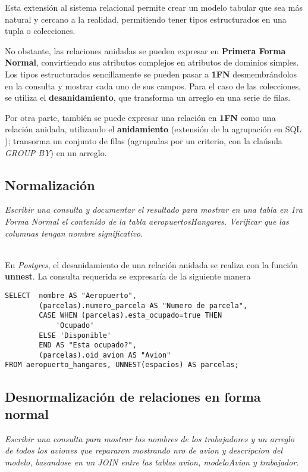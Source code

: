 Esta extensión al sistema relacional permite crear un modelo tabular que sea más natural y cercano a la realidad, permitiendo tener tipos estructurados en una tupla o colecciones.

No obstante, las relaciones anidadas se pueden expresar en \textbf{Primera Forma Normal}, convirtiendo sus atributos complejos en atributos de dominios simples. Los tipos estructurados sencillamente se pueden pasar a \textbf{1FN} desmembrándolos en la consulta y mostrar cada uno de sus campos. Para el caso de las colecciones, se utiliza el \textbf{desanidamiento}, que transforma un arreglo en una serie de filas.

Por otra parte, también se puede expresar una relación en \textbf{1FN} como una relación anidada, utilizando el \textbf{anidamiento} (extensión de la agrupación en SQL \autocite{silberschatz}); transorma un conjunto de filas (agrupadas por un criterio, con la claúsula \emph{GROUP BY}) en un arreglo.

\subsection{Normalización}
\emph{Escribir una consulta y documentar el resultado para mostrar en una tabla en 1ra Forma Normal el contenido de la tabla aeropuertosHangares. Verificar que las columnas tengan nombre significativo.} 

~\\

En \emph{Postgres}, el desanidamiento de una relación anidada se realiza con la función \textbf{unnest}. La consulta requerida se expresaría de la siguiente manera  

\vspace*{5mm}
\lstset{style=sql}
\begin{lstlisting}
SELECT  nombre AS "Aeropuerto", 
        (parcelas).numero_parcela AS "Numero de parcela", 
        CASE WHEN (parcelas).esta_ocupado=true THEN 
            'Ocupado' 
        ELSE 'Disponible' 
        END AS "Esta ocupado?", 
        (parcelas).oid_avion AS "Avion" 
FROM aeropuerto_hangares, UNNEST(espacios) AS parcelas;
\end{lstlisting}

\subsection{Desnormalización de relaciones en forma normal}
\emph{Escribir una consulta para mostrar los nombres de los trabajadores y un arreglo de todos los aviones que repararon mostrando nro de avion y descripcion del modelo, basandose en un JOIN entre las tablas avion, modeloAvion y trabajador.} 

